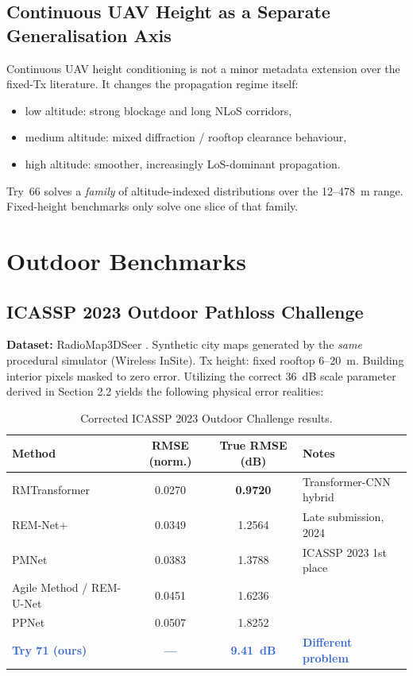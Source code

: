 \documentclass[11pt,a4paper]{article}
\newcommand{\better}[1]{\textcolor{good}{\textbf{#1}}}
\newcommand{\ours}[1]{\textcolor{highlight}{\textbf{#1}}}
\begin{document}
\subsection{Continuous UAV Height as a Separate Generalisation Axis}

Continuous UAV height conditioning is not a minor metadata extension over the
fixed-Tx literature. It changes the propagation regime itself:
\begin{itemize}[nosep]
    \item low altitude: strong blockage and long NLoS corridors,
    \item medium altitude: mixed diffraction / rooftop clearance behaviour,
    \item high altitude: smoother, increasingly LoS-dominant propagation.
\end{itemize}
Try~66 solves a \emph{family} of altitude-indexed distributions over the 12--478~m range.
Fixed-height benchmarks only solve one slice of that family.

\section{Outdoor Benchmarks}
\label{sec:outdoor}

\subsection{ICASSP 2023 Outdoor Pathloss Challenge}
\label{ssec:icassp2023}

\textbf{Dataset:} RadioMap3DSeer \cite{icassp2023challenge}. Synthetic city maps generated by the \emph{same} procedural simulator (Wireless InSite). Tx height: fixed rooftop 6--20~m. Building interior pixels masked to zero error. Utilizing the correct 36~dB scale parameter derived in Section 2.2 yields the following physical error realities:

\begin{table}[h!]
\centering
\caption{Corrected ICASSP 2023 Outdoor Challenge results.}
\label{tab:icassp2023}
\small
\begin{tabular}{lccl}
\toprule
\textbf{Method} & \textbf{RMSE (norm.)} & \textbf{True RMSE (dB)} & \textbf{Notes} \\
\midrule
RMTransformer \cite{rmtransformer2025} & 0.0270 & \better{0.9720} & Transformer-CNN hybrid \\
REM-Net+ \cite{remnet2024} & 0.0349 & 1.2564 & Late submission, 2024 \\
PMNet \cite{pmnet2023} & 0.0383 & 1.3788 & ICASSP 2023 1st place \\
Agile Method / REM-U-Net & 0.0451 & 1.6236 & \\
PPNet & 0.0507 & 1.8252 & \\
\midrule
\ours{Try 71 (ours)} & \ours{---} & \ours{9.41~dB} & \ours{Different problem} \\
\bottomrule
\end{tabular}
\end{table}
\normalsize
\end{document}
